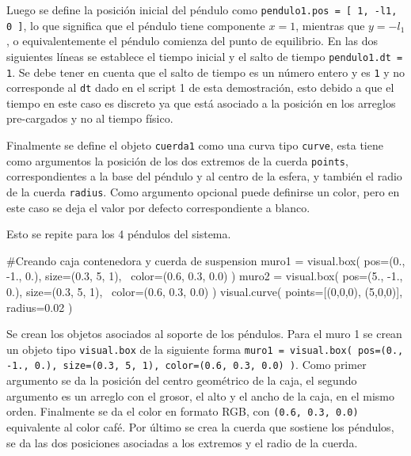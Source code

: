Luego se define la posición inicial del péndulo como
\texttt{pendulo1.pos = [ 1, -l1, 0 ]}, lo que significa que el péndulo 
tiene componente $x=1$, mientras que $y = -l_1$, o equivalentemente el 
péndulo comienza del punto de equilibrio. En las dos siguientes líneas
se establece el tiempo inicial y el salto de tiempo 
\texttt{pendulo1.dt = 1}. Se debe tener en cuenta que el salto de tiempo
es un número entero y es \texttt{1} y no corresponde al \texttt{dt} dado 
en el script 1 de esta demostración, esto debido a que el tiempo en este 
caso es discreto ya que está asociado a la posición en los arreglos pre-cargados 
y no al tiempo físico. 


Finalmente se define el objeto \texttt{cuerda1} como una curva tipo 
\texttt{curve}, esta tiene como argumentos la posición de los dos extremos 
de la cuerda \texttt{points}, correspondientes a la base del péndulo y al 
centro de la esfera, y también el radio de la cuerda \texttt{radius}. Como
argumento opcional puede definirse un color, pero en este caso se deja el 
valor por defecto correspondiente a blanco.


Esto se repite para los 4 péndulos del sistema.


\begin{listing}[style=python, numbers = none]
#Creando caja contenedora y cuerda de suspension
muro1 = visual.box( pos=(0., -1., 0.), size=(0.3, 5, 1), \
color=(0.6, 0.3, 0.0) )
muro2 = visual.box( pos=(5., -1., 0.), size=(0.3, 5, 1), \
color=(0.6, 0.3, 0.0) )
visual.curve( points=[(0,0,0), (5,0,0)], radius=0.02 )
\end{listing}
Se crean los objetos asociados al soporte de los péndulos. Para el muro 1
se crean un objeto tipo \texttt{visual.box} de la siguiente forma 
\texttt{muro1 = visual.box( pos=(0., -1., 0.), size=(0.3, 5, 1), 
color=(0.6, 0.3, 0.0) )}. Como primer argumento se da la posición del centro
geométrico de la caja, el segundo argumento es un arreglo con el grosor, 
el alto y el ancho de la caja, en el mismo orden. Finalmente se da el color
en formato RGB, con \texttt{(0.6, 0.3, 0.0)} equivalente al color café.
Por último se crea la cuerda que sostiene los péndulos, se da las dos 
posiciones asociadas a los extremos y el radio de la cuerda.


